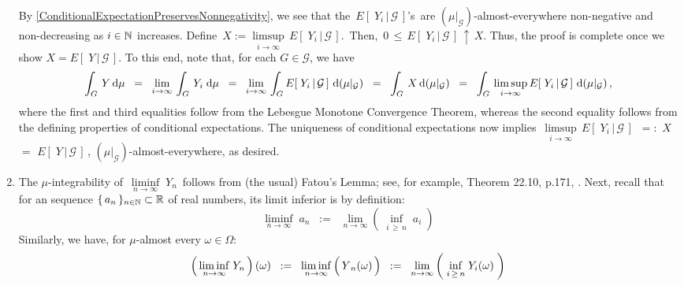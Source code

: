 \begin{enumerate}
	By \eqref{ConditionalExpectationPreservesNonnegativity}, we see that the
	\,$E\!\left[\;Y_{i}\,\vert\,\mathcal{G}\,\right]$'s\,
	are $(\mu\vert_{\mathcal{G}})$-almost-everywhere non-negative and non-decreasing as $i \in \mathbb{N}$ increases.
	Define \,$X := \underset{i\rightarrow\infty}{\limsup}\,E\!\left[\;Y_{i}\,\vert\,\mathcal{G}\,\right]$.\,
	Then, \,$0\,\leq\,E\!\left[\;Y_{i}\,\vert\,\mathcal{G}\,\right] \,\uparrow\, X$.
	Thus, the proof is complete once we show $X = E\!\left[\;Y\,\vert\,\mathcal{G}\,\right]$.
	To this end, note that, for each $G \in \mathcal{G}$, we have
	\begin{equation*}
	\int_{G}\,Y\,\textnormal{d}\mu
	\;\;=\;\;
	\underset{i\rightarrow\infty}{\lim}\,\int_{G}\,Y_{i}\;\textnormal{d}\mu
	\;\;=\;\;
	\underset{i\rightarrow\infty}{\lim}\,\int_{G}E\!\left[\;Y_{i}\,\vert\,\mathcal{G}\,\right]\,\textnormal{d}(\mu\vert_{\mathcal{G}})
	\;\;=\;\;
	\int_{G}\,X\,\textnormal{d}(\mu\vert_{\mathcal{G}})
	\;\;=\;\;
	\int_{G}\,\underset{i\rightarrow\infty}{\limsup}\,E\!\left[\;Y_{i}\,\vert\,\mathcal{G}\,\right]\,\textnormal{d}(\mu\vert_{\mathcal{G}})\,,
	\end{equation*}
	where the first and third equalities follow from the Lebesgue Monotone Convergence Theorem,
	whereas the second equality follows from the defining properties of conditional expectations.
	The uniqueness of conditional expectations now implies
	\,$\underset{i\rightarrow\infty}{\limsup}\,E\!\left[\;Y_{i}\,\vert\,\mathcal{G}\,\right]$
	\,$=:$ $X$ $=$ $E\!\left[\;Y\,\vert\,\mathcal{G}\,\right]$\,,
	$(\mu\vert_{\mathcal{G}})$-almost-everywhere, as desired.
\item
	The $\mu$-integrability of \,$\underset{n\rightarrow\infty}{\liminf}\;Y_{n}$\, follows from (the usual)
	Fatou's Lemma; see, for example, Theorem 22.10, p.171, \cite{Aliprantis1998}.
	Next, recall that for an sequence $\{\,a_{n}\,\}_{n\in\mathbb{N}} \subset \mathbb{R}$ of real numbers, its limit inferior is by definition:
	\begin{equation*}
	\underset{n\rightarrow\infty}{\liminf}\;a_{n}
	\;\; := \;\;
		\underset{n\rightarrow\infty}{\lim}\left(\;\underset{i\,\geq\,n}{\inf}\;a_{i}\;\right)
	\end{equation*}
	Similarly, we have, for $\mu$-almost every $\omega \in \Omega$:
	\begin{equation*}
	\left(\,\underset{n\rightarrow\infty}{\liminf}\;Y_{n}\,\right)(\omega)
	\;\; := \;\;
	\underset{n\rightarrow\infty}{\liminf}\left(\,\overset{{\color{white}.}}{Y}_{n}(\omega)\,\right)
	\;\; := \;\;
		\underset{n\rightarrow\infty}{\lim}\left(\;\underset{i\,\geq\,n}{\inf}\;Y_{i}(\omega)\;\right)

\end{equation*}
\end{enumerate}
